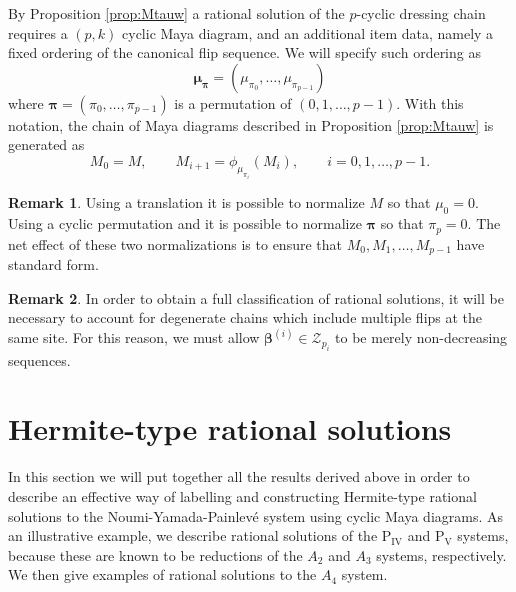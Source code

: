 \documentclass{amsart}
\theoremstyle{definition}
\newtheorem{remark}{Remark}
\newcommand{\bbeta}{{\boldsymbol{\beta}}}
\newcommand{\bmu}{{\boldsymbol{\mu}}}
\newcommand{\bpi}{{\boldsymbol{\pi}}}
\newcommand{\PIV}{$\mathrm{P}_{\mathrm{IV}}\,\,$}
\newcommand{\PV}{$\mathrm{P}_{\mathrm{V}}\,\,$}
\newcommand{\cZ}{\mathcal{Z}}
\begin{document}
By Proposition \ref{prop:Mtauw} a rational solution of the
$p$-cyclic dressing chain requires a $(p,k)$ cyclic Maya diagram, and
an additional item data, namely a fixed ordering of the canonical
flip sequence.
We will specify such ordering  as
\[ \bmu_\bpi = (\mu_{\pi_0},\ldots, \mu_{\pi_{p-1}}) \] where
$\bpi=(\pi_0,\ldots, \pi_{p-1})$ is a permutation of
$(0,1,\ldots, p-1)$. With this notation, the chain of Maya diagrams
described in Proposition \ref{prop:Mtauw} is generated as
\begin{equation}\label{eq:picycle}
 M_0 = M,\qquad M_{i+1} =  \phi_{\mu_{\pi_i}}(M_i),\qquad i=0,1,\ldots, p-1.
 \end{equation}
\begin{remark}\label{rem:normalization}
Using a translation it is possible to normalize $M$ so that
$\mu_{0} = 0$.  Using a cyclic permutation and it is possible to
normalize $\bpi$ so that $\pi_p=0$.  The net effect of these two
normalizations is to ensure  that
$M_0,M_1,\ldots, M_{p-1}$ have standard form.
\end{remark}

\begin{remark}
  In order to obtain a full classification of rational solutions, it
  will be necessary to account for degenerate chains which include
  multiple flips at the same site. For this reason, we must allow
  $\bbeta^{(i)}\in \cZ_{p_i}$ to be merely non-decreasing sequences.
\end{remark}








\section{Hermite-type rational solutions}\label{sec:A4}
In this section we will put together all the results derived above in
order to describe an effective way of labelling and constructing
Hermite-type rational solutions to the Noumi-Yamada-Painlev\'e system
using cyclic Maya diagrams. As an illustrative example, we describe
rational solutions of the \PIV and \PV systems, because these are
known to be reductions of the $A_2$ and $A_3$ systems, respectively.
We then give examples of rational solutions to the $A_4$ system.
\end{document}
